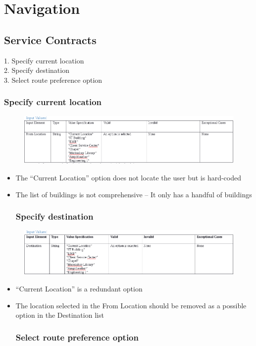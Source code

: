 \documentclass[english]{article}
\begin{document}
\section{Navigation}
\subsection{Service Contracts}
1.	Specify current location\\
2.	Specify destination\\
3.	Select route preference option\\
\subsubsection{Specify current location}
\begin{figure}[ht!]
\hspace*{-2.5cm}
\includegraphics[width=180mm]{Nav1.png}
\end{figure}
\begin{itemize}
\item	The “Current Location” option does not locate the user but is hard-coded\\
\item	The list of buildings is not comprehensive – It only has a handful of buildings\\
\subsubsection{Specify destination}
\end{itemize}
\begin{figure}[ht!]
\hspace*{-2.5cm}
\includegraphics[width=180mm]{Nav2.png}
\end{figure}
\begin{itemize}
\item	“Current Location” is a redundant option\\
\item	The location selected in the From Location should be removed as a possible option in the Destination list\\
\subsubsection{Select route preference option}
\end{itemize}
\end{document}
